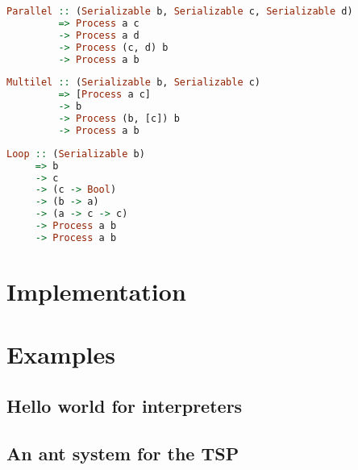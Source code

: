 \begin{lstlisting}[language=Haskell]
Parallel :: (Serializable b, Serializable c, Serializable d)
         => Process a c
         -> Process a d
         -> Process (c, d) b
         -> Process a b
\end{lstlisting}

\begin{lstlisting}[language=Haskell]
Multilel :: (Serializable b, Serializable c)
         => [Process a c]
         -> b
         -> Process (b, [c]) b
         -> Process a b
\end{lstlisting}

\begin{lstlisting}[language=Haskell]
Loop :: (Serializable b)
     => b
     -> c
     -> (c -> Bool)
     -> (b -> a)
     -> (a -> c -> c)
     -> Process a b
     -> Process a b
\end{lstlisting}

\section{Implementation}

\section{Examples}

\subsection{Hello world for interpreters}

\subsection{An ant system for the TSP}
